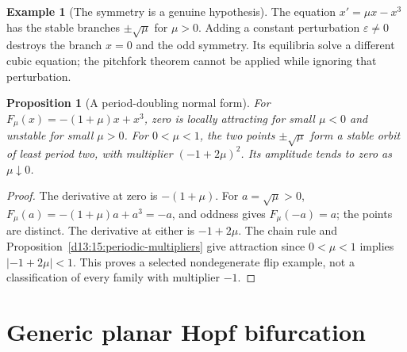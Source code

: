 \documentclass[11pt,oneside]{book}
\newtheorem{proposition}[theorem]{Proposition}
\theoremstyle{definition}
\newtheorem{example}[theorem]{Example}
\theoremstyle{remark}\newtheorem{remark}[theorem]{Remark}
\newcommand{\abs}[1]{\lvert#1\rvert}\newcommand{\norm}[1]{\lVert#1\rVert}
\begin{document}
\begin{example}[The symmetry is a genuine hypothesis]
The equation \(x'=\mu x-x^3\) has the stable branches
\(\pm\sqrt{\mu}\) for \(\mu>0\). Adding a constant perturbation
\(\varepsilon\neq0\) destroys the branch \(x=0\) and the odd symmetry.
Its equilibria solve a different cubic equation; the pitchfork theorem
cannot be applied while ignoring that perturbation.
\end{example}

\begin{proposition}[A period-doubling normal form]\label{d13:16:flip-normal-form}
For \(F_\mu(x)=-(1+\mu)x+x^3\), zero is locally attracting for small
\(\mu<0\) and unstable for small \(\mu>0\). For \(0<\mu<1\),
the two points \(\pm\sqrt{\mu}\) form a stable orbit of least period two,
with multiplier \((-1+2\mu)^2\). Its amplitude tends to zero as
\(\mu\downarrow0\).
\end{proposition}
\begin{proof}
The derivative at zero is \(-(1+\mu)\).
For \(a=\sqrt{\mu}>0\),
\(F_\mu(a)=-(1+\mu)a+a^3=-a\), and oddness gives \(F_\mu(-a)=a\);
the points are distinct. The derivative at either is \(-1+2\mu\).
The chain rule and Proposition~\ref{d13:15:periodic-multipliers}
give attraction since \(0<\mu<1\) implies \(\abs{-1+2\mu}<1\).
This proves a selected nondegenerate flip example, not a classification
of every family with multiplier \(-1\).
\end{proof}

\section{Generic planar Hopf bifurcation}
\end{document}
